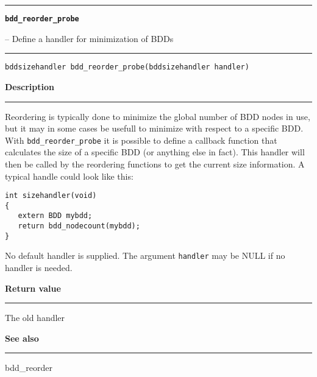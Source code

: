 \vspace{8ex}
\begin{minipage}{\textwidth}

\noindent\begin{minipage}{\textwidth}
\rule{\textwidth}{0.5mm}
{\tt\bf bdd\_reorder\_probe }
\--- Define a handler for minimization of BDDs  \hspace{\fill}
\\\rule[1.5ex]{\textwidth}{0.5mm}
\end{minipage}

\noindent\begin{verbatim}
bddsizehandler bdd_reorder_probe(bddsizehandler handler) 
\end{verbatim}

\vspace{\parsep}\noindent
{\bf Description}\\\rule[1.5ex]{\textwidth}{0.2mm}\vspace{-1.5ex}\setlength{\parindent}{1em}
Reordering is typically done to minimize the global number of
           BDD nodes in use, but it may in some cases be usefull to minimize
	   with respect to a specific BDD. With {\tt bdd\_reorder\_probe} it
	   is possible to define a callback function that calculates the
	   size of a specific BDD (or anything else in fact). This handler
	   will then be called by the reordering functions to get the current
	   size information. A typical handle could look like this:
\begin{verbatim}
int sizehandler(void)
{
   extern BDD mybdd;
   return bdd_nodecount(mybdd);
}
\end{verbatim}
	   No default handler is supplied. The argument {\tt handler} may be
	   NULL if no handler is needed. 

\setlength{\parindent}{0em}\vspace{\parsep}\vspace{\baselineskip}\noindent
{\bf Return value}\\\rule[1.5ex]{\textwidth}{0.2mm}\vspace{-1.5ex}
The old handler 

\vspace{\parsep}\vspace{\baselineskip}\noindent
{\bf See also}\\\rule[1.5ex]{\textwidth}{0.2mm}\vspace{-1.5ex}
bdd\_reorder 
\end{minipage}
